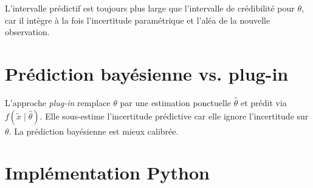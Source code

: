 \begin{remarque}
L'intervalle pr\'edictif est toujours plus large que l'intervalle de
cr\'edibilit\'e pour $\theta$, car il int\`egre \`a la fois l'incertitude
param\'etrique et l'al\'ea de la nouvelle observation.
\end{remarque}

\section{Pr\'ediction bay\'esienne vs. plug-in}

\begin{attention}[title=\textbf{Danger du plug-in}]
L'approche \textit{plug-in} remplace $\theta$ par une estimation
ponctuelle $\hat{\theta}$ et pr\'edit via $f(\tilde{x} \mid \hat{\theta})$.
Elle sous-estime l'incertitude pr\'edictive car elle ignore l'incertitude
sur $\theta$. La pr\'ediction bay\'esienne est mieux calibr\'ee.
\end{attention}

\section{Impl\'ementation Python}

